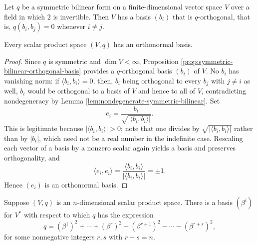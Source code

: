 \begin{proposition}
\label{prop:symmetric-bilinear-orthogonal-basis}
\mathlibok
Let $q$ be a symmetric bilinear form on a finite-dimensional vector space $V$ over a field in which $2$ is invertible. Then $V$ has a basis $(b_i)$ that is $q$-orthogonal, that is, $q(b_i, b_j) = 0$ whenever $i \neq j$.
\end{proposition}

\begin{proposition}
\label{prop:scalar-product-orthonormal-basis}
\leanok
{}
Every scalar product space $(V,q)$ has an orthonormal basis.
\end{proposition}

\begin{proof}
\leanok
{}
Since $q$ is symmetric and $\dim V < \infty$, Proposition \ref{prop:symmetric-bilinear-orthogonal-basis} provides a $q$-orthogonal basis $(b_i)$ of $V$. No $b_i$ has vanishing norm: if $\langle b_i, b_i \rangle = 0$, then, $b_i$ being orthogonal to every $b_j$ with $j \neq i$ as well, $b_i$ would be orthogonal to a basis of $V$ and hence to all of $V$, contradicting nondegeneracy by Lemma \ref{lem:nondegenerate-symmetric-bilinear}. Set
\[
e_i = \frac{b_i}{\sqrt{|\langle b_i, b_i \rangle|}}.
\]
This is legitimate because $|\langle b_i, b_i \rangle| > 0$; note that one divides by $\sqrt{|\langle b_i,b_i\rangle|}$ rather than by $|b_i|$, which need not be a real number in the indefinite case. Rescaling each vector of a basis by a nonzero scalar again yields a basis and preserves orthogonality, and
\[
\langle e_i, e_i \rangle = \frac{\langle b_i, b_i \rangle}{|\langle b_i, b_i \rangle|} = \pm 1 .
\]
Hence $(e_i)$ is an orthonormal basis.
\end{proof}

\begin{corollary}
\label{cor:scalar-product-signature-form}
\leanok
{}
Suppose $(V, q)$ is an $n$-dimensional scalar product space. There is a basis $(\beta^i)$ for $V^*$ with respect to which $q$ has the expression
\[
q = (\beta^1)^2 + \cdots + (\beta^r)^2 - (\beta^{r+1})^2 - \cdots - (\beta^{r+s})^2,
\]
for some nonnegative integers $r, s$ with $r + s = n$.
\end{corollary}

